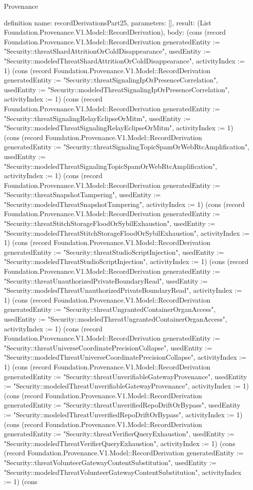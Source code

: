 \begin{lexlean}{Provenance}
\begin{semanticmodule}
definition{
  name: recordDerivationsPart25,
  parameters: [],
  result: (List Foundation.Provenance.V1.Model::RecordDerivation),
  body: (cons (record Foundation.Provenance.V1.Model::RecordDerivation {generatedEntity := "Security::threatShardAttritionOrColdDisappearance", usedEntity := "Security::modeledThreatShardAttritionOrColdDisappearance", activityIndex := 1}) (cons (record Foundation.Provenance.V1.Model::RecordDerivation {generatedEntity := "Security::threatSignalingIpOrPresenceCorrelation", usedEntity := "Security::modeledThreatSignalingIpOrPresenceCorrelation", activityIndex := 1}) (cons (record Foundation.Provenance.V1.Model::RecordDerivation {generatedEntity := "Security::threatSignalingRelayEclipseOrMitm", usedEntity := "Security::modeledThreatSignalingRelayEclipseOrMitm", activityIndex := 1}) (cons (record Foundation.Provenance.V1.Model::RecordDerivation {generatedEntity := "Security::threatSignalingTopicSpamOrWebRtcAmplification", usedEntity := "Security::modeledThreatSignalingTopicSpamOrWebRtcAmplification", activityIndex := 1}) (cons (record Foundation.Provenance.V1.Model::RecordDerivation {generatedEntity := "Security::threatSnapshotTampering", usedEntity := "Security::modeledThreatSnapshotTampering", activityIndex := 1}) (cons (record Foundation.Provenance.V1.Model::RecordDerivation {generatedEntity := "Security::threatStitchStorageFloodOrSybilExhaustion", usedEntity := "Security::modeledThreatStitchStorageFloodOrSybilExhaustion", activityIndex := 1}) (cons (record Foundation.Provenance.V1.Model::RecordDerivation {generatedEntity := "Security::threatStudioScriptInjection", usedEntity := "Security::modeledThreatStudioScriptInjection", activityIndex := 1}) (cons (record Foundation.Provenance.V1.Model::RecordDerivation {generatedEntity := "Security::threatUnauthorizedPrivateBoundaryRead", usedEntity := "Security::modeledThreatUnauthorizedPrivateBoundaryRead", activityIndex := 1}) (cons (record Foundation.Provenance.V1.Model::RecordDerivation {generatedEntity := "Security::threatUngrantedContainerOrganAccess", usedEntity := "Security::modeledThreatUngrantedContainerOrganAccess", activityIndex := 1}) (cons (record Foundation.Provenance.V1.Model::RecordDerivation {generatedEntity := "Security::threatUniverseCoordinatePrecisionCollapse", usedEntity := "Security::modeledThreatUniverseCoordinatePrecisionCollapse", activityIndex := 1}) (cons (record Foundation.Provenance.V1.Model::RecordDerivation {generatedEntity := "Security::threatUnverifiableGatewayProvenance", usedEntity := "Security::modeledThreatUnverifiableGatewayProvenance", activityIndex := 1}) (cons (record Foundation.Provenance.V1.Model::RecordDerivation {generatedEntity := "Security::threatUnverifiedRepoDriftOrBypass", usedEntity := "Security::modeledThreatUnverifiedRepoDriftOrBypass", activityIndex := 1}) (cons (record Foundation.Provenance.V1.Model::RecordDerivation {generatedEntity := "Security::threatVerifierQueryExhaustion", usedEntity := "Security::modeledThreatVerifierQueryExhaustion", activityIndex := 1}) (cons (record Foundation.Provenance.V1.Model::RecordDerivation {generatedEntity := "Security::threatVolunteerGatewayContentSubstitution", usedEntity := "Security::modeledThreatVolunteerGatewayContentSubstitution", activityIndex := 1}) (cons }
\end{semanticmodule}
\end{lexlean}
